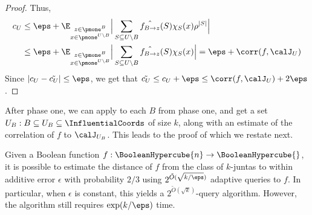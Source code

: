 \begin{proof}
Thus,
     \begin{align*}
     c_U  &\le \eps +   
     \E_{\substack{z \in \pmone^{B}\\x \in \pmone^{U \setminus B}}}
     \Big | \sum_{S \subseteq U\setminus B} \hat{f_{B \to z}}(S)\chi_S(x)\rho^{|S|}\Big| \nonumber \\
     &\le  \eps +
     \E_{\substack{z \in \pmone^{B}\\x \in \pmone^{U \setminus B}}}
     \Big | \sum_{S \subseteq U\setminus B} \hat{f_{B \to z}}(S)\chi_S(x)\Big|
      = \eps + 
     \corr(f, \calJ_U)\end{align*}
  Since $|c_U - \tilde{c_U}| \le \eps$, we get that  $\tilde{c_U} \le c_U + \eps \le \corr(f, \calJ_U) + 2\eps$.
\end{proof}



After phase one, we can apply  to each $B$ from phase one, and get a set $U_B: B \subseteq U_B \subseteq \InfluentialCoords$ of size $k$, along with an estimate of the correlation of $f$ to $\calJ_{U_B}$. This leads to the proof of  which we restate next.
\begin{theorem}
Given a Boolean function $f: \BooleanHypercube{n} \to \BooleanHypercube{}$, it is possible to estimate the distance of $f$ from the class of $k$-juntas to within additive error $\epsilon$ with probability $2/3$ using 
$ 2^{\tilde{O}(\sqrt{k/\eps})}$ adaptive queries to $f$. In particular, when $\epsilon$ is constant, this yields a $2^{\tilde{O}(\sqrt{k})}$-query algorithm. However, the algorithm still requires $\exp(k/\eps)$ time.
\end{theorem}

